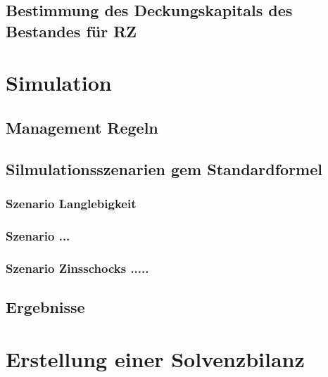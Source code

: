 \documentclass[parskip,12pt,paper=a4]{scrartcl}
\begin{document}
\subsection{Bestimmung des Deckungskapitals des Bestandes für RZ}

\section{Simulation}

\subsection{Management Regeln}
\subsection{Silmulationsszenarien gem Standardformel}
\subsubsection{Szenario Langlebigkeit}
\subsubsection{Szenario ...}
\subsubsection{Szenario Zinsschocks .....}
\subsection{Ergebnisse}
\section{Erstellung einer Solvenzbilanz}
\end{document}
